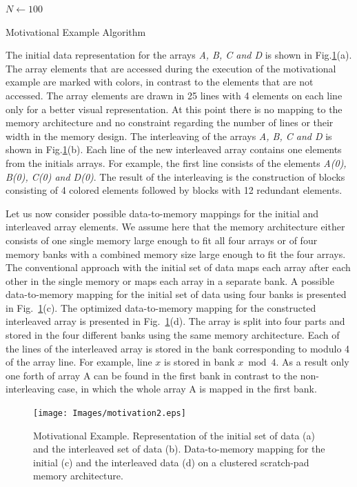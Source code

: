 \documentclass[prodmode,acmtecs]{acmsmall}
\begin{document}
\begin{algorithm}[t]
\SetAlgoNoLine
$N \leftarrow 100$ \newline
{}
\caption{Motivational Example Algorithm}
\label{alg:motivation}
\end{algorithm}

The initial data representation for the arrays \textit{A, B, C and D} is shown in Fig.\ref{fig:motivation}(a). 
The array elements that are accessed during the execution of the motivational example are marked with colors, in contrast to the elements that are not accessed.
The array elements are drawn in 25 lines with 4 elements on each line only for a better visual representation.
At this point there is no mapping to the memory architecture and no constraint regarding the number of lines or their width in the memory design.
The interleaving of the arrays \textit{A, B, C and D} is shown in Fig.\ref{fig:motivation}(b). 
Each line of the new interleaved array contains one elements from the initials arrays.
For example, the first line consists of the elements \textit{A(0), B(0), C(0) and D(0)}. 
The result of the interleaving is the construction of blocks consisting of 4 colored elements followed by blocks with 12 redundant elements.

Let us now consider possible data-to-memory mappings for the initial and interleaved array elements.
We assume here that the memory architecture either consists of one single memory large enough to fit all four arrays or of four memory banks with a combined memory size large enough to fit the four arrays.
The conventional approach with the initial set of data maps each array after each other in the single memory or maps each array in a separate bank.
A possible data-to-memory mapping for the initial set of data using four banks is presented in Fig.~\ref{fig:motivation}(c). 
The optimized data-to-memory mapping for the constructed interleaved array is presented in Fig.~\ref{fig:motivation}(d).
The array is split into four parts and stored in the four different banks using the same memory architecture.
Each of the lines of the interleaved array is stored in the bank corresponding to modulo 4 of the array line.
For example, line $x$ is stored in bank $x \bmod 4$.
As a result only one forth of array A can be found in the first bank in contrast to the non-interleaving case, in which the whole array A is mapped in the first bank.

\begin{figure}
\centering
	\texttt{[image: Images/motivation2.eps]}
	\caption{Motivational Example. Representation of the initial set of data (a) and the interleaved set of data (b). Data-to-memory mapping for the initial (c) and the interleaved data (d) on a clustered scratch-pad memory architecture.}	
	\label{fig:motivation}
\end{figure}
\end{document}
